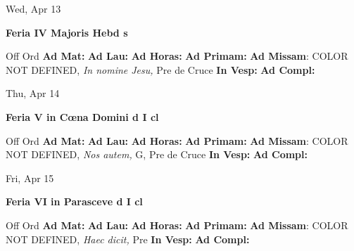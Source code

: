 \documentclass[10pt]{memoir}
\begin{document}
\begin{center}
\begin{minipage}{3.5in}
\vspace{2em}
\begin{center}Wed, Apr 13
\end{center}
\textbf{ \large Feria IV Majoris Hebd
\textnormal{\normalsize s}}

\begin{justify}Off Ord
\textbf{Ad Mat: }
\textbf{Ad Lau: }
\textbf{Ad Horas: }
\textbf{Ad Primam: }\textbf{Ad Missam}: COLOR NOT DEFINED, \textit{In nomine Jesu,} Pre de Cruce
\textbf{In Vesp: }
\textbf{Ad Compl: }
\end{justify}
\end{minipage}
\end{center}

\begin{center}
\begin{minipage}{3.5in}
\vspace{2em}
\begin{center}Thu, Apr 14
\end{center}
\textbf{ \large Feria V in Cœna Domini
\textnormal{\normalsize d I cl}}

\begin{justify}Off Ord
\textbf{Ad Mat: }
\textbf{Ad Lau: }
\textbf{Ad Horas: }
\textbf{Ad Primam: }\textbf{Ad Missam}: COLOR NOT DEFINED, \textit{Nos autem,} G, Pre de Cruce
\textbf{In Vesp: }
\textbf{Ad Compl: }
\end{justify}
\end{minipage}
\end{center}

\begin{center}
\begin{minipage}{3.5in}
\vspace{2em}
\begin{center}Fri, Apr 15
\end{center}
\textbf{ \large Feria VI in Parasceve
\textnormal{\normalsize d I cl}}

\begin{justify}Off Ord
\textbf{Ad Mat: }
\textbf{Ad Lau: }
\textbf{Ad Horas: }
\textbf{Ad Primam: }\textbf{Ad Missam}: COLOR NOT DEFINED, \textit{Haec dicit,} Pre 
\textbf{In Vesp: }
\textbf{Ad Compl: }
\end{justify}
\end{minipage}
\end{center}
\end{document}

